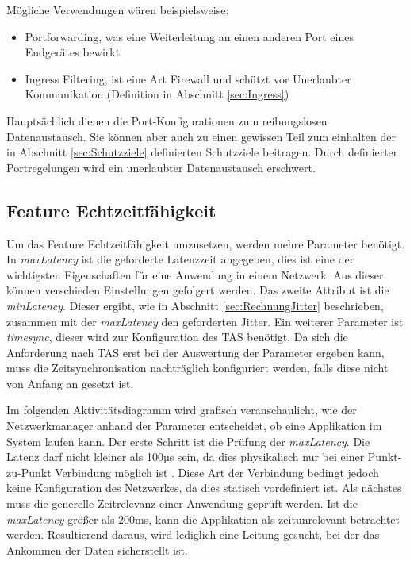 Mögliche Verwendungen wären beispielsweise:
\begin{itemize}
	\item Portforwarding, was eine Weiterleitung an einen anderen Port eines Endgerätes bewirkt
	\item Ingress Filtering, ist eine Art Firewall und schützt vor Unerlaubter Kommunikation (Definition in Abschnitt \ref{sec:Ingress})
\end{itemize}

Hauptsächlich dienen die Port-Konfigurationen zum reibungslosen Datenaustausch. Sie können aber auch zu einen gewissen Teil zum einhalten der in Abschnitt \ref{sec:Schutzziele} definierten Schutzziele beitragen. Durch definierter Portregelungen wird ein unerlaubter Datenaustausch erschwert.

\subsection{Feature Echtzeitfähigkeit}
Um das Feature Echtzeitfähigkeit umzusetzen, werden mehre Parameter benötigt. In \emph{maxLatency} ist die geforderte Latenzzeit angegeben, dies ist eine der wichtigsten Eigenschaften für eine Anwendung in einem Netzwerk. Aus dieser können verschieden Einstellungen gefolgert werden. Das zweite Attribut ist die \emph{minLatency}. Dieser ergibt, wie in Abschnitt \ref{sec:RechnungJitter} beschrieben, zusammen mit der \emph{maxLatency} den geforderten Jitter. Ein weiterer Parameter ist \emph{timesync}, dieser wird zur Konfiguration des \acf{TAS} benötigt. Da sich die Anforderung nach \ac{TAS} erst bei der Auswertung der Parameter ergeben kann, muss die Zeitsynchronisation nachträglich konfiguriert werden, falls diese nicht von Anfang an gesetzt ist.

Im folgenden Aktivitätsdiagramm wird grafisch veranschaulicht, wie der Netzwerkmanager anhand der Parameter entscheidet, ob eine Applikation im System laufen kann. Der erste Schritt ist die Prüfung der \emph{maxLatency}. Die Latenz darf nicht kleiner als 100µs sein, da dies physikalisch nur bei einer Punkt-zu-Punkt Verbindung möglich ist . Diese Art der Verbindung bedingt jedoch keine Konfiguration des Netzwerkes, da dies statisch vordefiniert ist. Als nächstes muss die generelle Zeitrelevanz einer Anwendung geprüft werden. Ist die \emph{maxLatency} größer als 200ms, kann die Applikation als zeitunrelevant betrachtet werden. Resultierend daraus, wird lediglich eine Leitung gesucht, bei der das Ankommen der Daten sicherstellt ist. 


